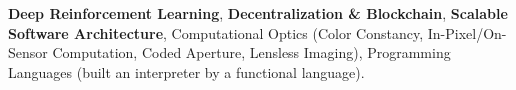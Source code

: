 \textbf{Deep Reinforcement Learning}, \textbf{Decentralization \& Blockchain}, \textbf{Scalable Software Architecture}, Computational Optics (Color Constancy, In-Pixel/On-Sensor Computation, Coded Aperture, Lensless Imaging), Programming Languages (built an interpreter by a functional language).
